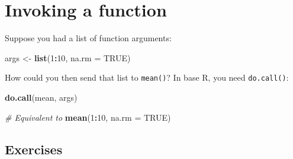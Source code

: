 \documentclass[]{book}
\newenvironment{Shaded}{\begin{snugshade}}{\end{snugshade}}
\newcommand{\CommentTok}[1]{\textcolor[rgb]{0.56,0.35,0.01}{\textit{#1}}}
\newcommand{\DataTypeTok}[1]{\textcolor[rgb]{0.13,0.29,0.53}{#1}}
\newcommand{\DecValTok}[1]{\textcolor[rgb]{0.00,0.00,0.81}{#1}}
\newcommand{\KeywordTok}[1]{\textcolor[rgb]{0.13,0.29,0.53}{\textbf{#1}}}
\newcommand{\NormalTok}[1]{#1}
\newcommand{\OperatorTok}[1]{\textcolor[rgb]{0.81,0.36,0.00}{\textbf{#1}}}
\newcommand{\OtherTok}[1]{\textcolor[rgb]{0.56,0.35,0.01}{#1}}
\newcommand{\StringTok}[1]{\textcolor[rgb]{0.31,0.60,0.02}{#1}}
\theoremstyle{definition}
\theoremstyle{definition}
\theoremstyle{definition}
\theoremstyle{remark}
\begin{document}
\hypertarget{invoking-a-function}{%
\section{Invoking a function}\label{invoking-a-function}}

Suppose you had a list of function arguments:

\begin{Shaded}
\begin{Highlighting}[]
\NormalTok{args <-}\StringTok{ }\KeywordTok{list}\NormalTok{(}\DecValTok{1}\OperatorTok{:}\DecValTok{10}\NormalTok{, }\DataTypeTok{na.rm =} \OtherTok{TRUE}\NormalTok{)}
\end{Highlighting}
\end{Shaded}

How could you then send that list to \texttt{mean()}? In base R, you
need \texttt{do.call()}:

\begin{Shaded}
\begin{Highlighting}[]
\KeywordTok{do.call}\NormalTok{(mean, args)}
\end{Highlighting}
\end{Shaded}

\begin{Shaded}
\begin{Highlighting}[]
\CommentTok{# Equivalent to}
\KeywordTok{mean}\NormalTok{(}\DecValTok{1}\OperatorTok{:}\DecValTok{10}\NormalTok{, }\DataTypeTok{na.rm =} \OtherTok{TRUE}\NormalTok{)}
\end{Highlighting}
\end{Shaded}

\hypertarget{exercises-5}{%
\subsection{Exercises}\label{exercises-5}}
\end{document}
